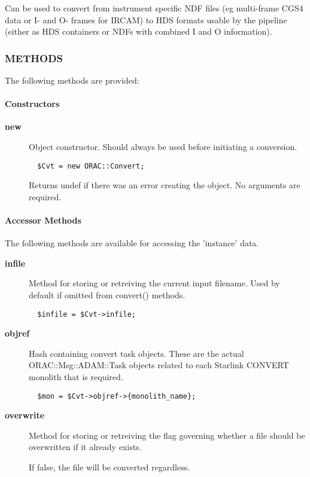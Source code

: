 Can be used to convert from instrument specific NDF files (eg
multi-frame CGS4 data or I- and O- frames for IRCAM) to HDS formats
usable by the pipeline (either as HDS containers or NDFs with combined
I and O information).

\subsubsection*{METHODS\label{ORAC::Convert_METHODS}}

The following methods are provided:

\paragraph*{Constructors\label{ORAC::Convert_Constructors}}\begin{description}
\item[\textbf{new}] \mbox{}

Object constructor. Should always be used before initiating a conversion.

\begin{verbatim}
  $Cvt = new ORAC::Convert;
\end{verbatim}


Returns undef if there was an error creating the object. No arguments
are required.

\end{description}
\paragraph*{Accessor Methods\label{ORAC::Convert_Accessor_Methods}}

The following methods are available for accessing the 
'instance' data.

\begin{description}
\item[\textbf{infile}] \mbox{}

Method for storing or retreiving the current input filename.
Used by default if omitted from convert() methods.

\begin{verbatim}
  $infile = $Cvt->infile;
\end{verbatim}
\item[\textbf{objref}] \mbox{}

Hash containing convert task objects. These are the actual
ORAC::Msg::ADAM::Task objects related to each Starlink CONVERT
monolith that is required.

\begin{verbatim}
  $mon = $Cvt->objref->{monolith_name};
\end{verbatim}
\item[\textbf{overwrite}] \mbox{}

Method for storing or retreiving the flag governing whether
a file should be overwritten if it already exists.



If false, the file will be converted regardless.

\end{description}
